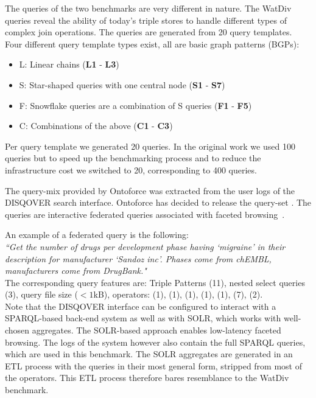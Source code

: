 The queries of the two benchmarks are very different in nature. 
The WatDiv queries reveal the ability of today's triple stores to handle different types of complex join operations.
The queries are generated from 20 query templates. Four different query template types exist, all are basic graph patterns (BGPs): 
\begin{itemize}
	\item L: Linear chains (\textbf{L1} - \textbf{L3})
	\item S: Star-shaped queries with one central node (\textbf{S1} - \textbf{S7})
	\item F: Snowflake queries are a combination of S queries (\textbf{F1} - \textbf{F5})
	\item C: Combinations of the above (\textbf{C1} - \textbf{C3})
\end{itemize}
Per query template we generated 20 queries. In the original work we used 100 queries but to speed up the benchmarking process and to reduce the infrastructure cost we switched to 20, corresponding to 400 queries.

The query-mix provided by Ontoforce was extracted from the user logs of the DISQOVER search interface. Ontoforce has decided to release the query-set .
The queries are interactive federated queries associated with faceted browsing~\cite{Ferre, Oren}.

An example of a federated query is the following: \\

\textit{``Get the number of drugs per development phase having `migraine'
in their description for manufacturer `Sandoz inc'. Phases come
from chEMBL, manufacturers come from DrugBank."} \\

The corresponding query features are: Triple Patterns (11), nested select queries (3), query file size ($<1$kB), operators:  (1), (1), (1), (1), (1), (7), (2).  \\

Note that the DISQOVER interface can be configured to interact with a SPARQL-based back-end system as well as with SOLR, which works with well-chosen aggregates. The SOLR-based approach enables low-latency faceted browsing. The logs of the system however also contain the full SPARQL queries, which are used in this benchmark. 
The SOLR aggregates are generated in an ETL process with the queries in their most general form, stripped from most of the operators. This ETL process therefore bares resemblance to the WatDiv benchmark.

